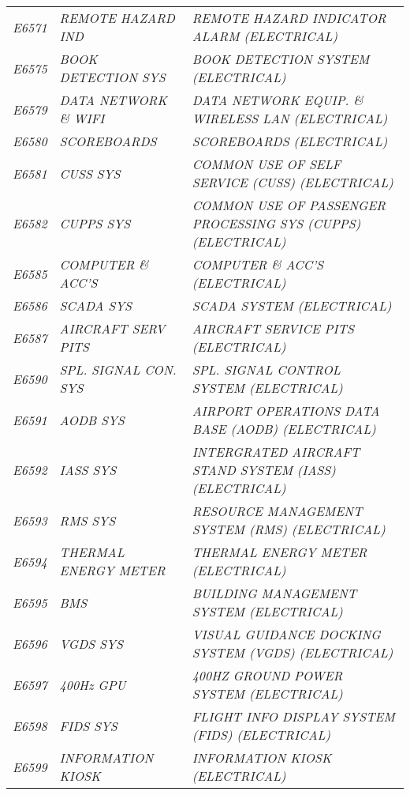\begin{landscape}
\begin{longtable}[l]{l%
                  l|%
                  l|}
\itshape E6571       &\itshape REMOTE HAZARD IND   &\itshape REMOTE HAZARD INDICATOR ALARM (ELECTRICAL)   \\
\itshape E6575       &\itshape BOOK DETECTION SYS   &\itshape BOOK DETECTION SYSTEM (ELECTRICAL)   \\
\itshape E6579       &\itshape DATA NETWORK \& WIFI   &\itshape DATA NETWORK EQUIP. \& WIRELESS LAN (ELECTRICAL)   \\
\itshape E6580       &\itshape SCOREBOARDS   &\itshape SCOREBOARDS (ELECTRICAL)   \\
\itshape E6581       &\itshape CUSS SYS   &\itshape COMMON USE OF SELF SERVICE (CUSS) (ELECTRICAL)   \\
\itshape E6582       &\itshape CUPPS SYS   &\itshape COMMON USE OF PASSENGER PROCESSING SYS (CUPPS) (ELECTRICAL)   \\
\itshape E6585       &\itshape COMPUTER \& ACC'S   &\itshape COMPUTER \& ACC'S (ELECTRICAL)   \\
\itshape E6586       &\itshape SCADA SYS   &\itshape SCADA SYSTEM (ELECTRICAL)   \\
\itshape E6587       &\itshape AIRCRAFT SERV PITS   &\itshape AIRCRAFT SERVICE PITS (ELECTRICAL)   \\
\itshape E6590       &\itshape SPL. SIGNAL CON. SYS   &\itshape SPL. SIGNAL CONTROL SYSTEM (ELECTRICAL)   \\
\itshape E6591       &\itshape AODB SYS   &\itshape AIRPORT OPERATIONS DATA BASE (AODB) (ELECTRICAL)   \\
\itshape E6592       &\itshape IASS SYS   &\itshape INTERGRATED AIRCRAFT STAND SYSTEM (IASS) (ELECTRICAL)   \\
\itshape E6593       &\itshape RMS SYS   &\itshape RESOURCE MANAGEMENT SYSTEM (RMS) (ELECTRICAL)   \\
\itshape E6594       &\itshape THERMAL ENERGY METER   &\itshape THERMAL ENERGY METER (ELECTRICAL)   \\
\itshape E6595       &\itshape BMS   &\itshape BUILDING MANAGEMENT SYSTEM (ELECTRICAL)   \\
\itshape E6596       &\itshape VGDS SYS   &\itshape VISUAL GUIDANCE DOCKING SYSTEM (VGDS) (ELECTRICAL)   \\
\itshape E6597       &\itshape 400Hz GPU   &\itshape 400HZ GROUND POWER SYSTEM (ELECTRICAL)   \\
\itshape E6598       &\itshape FIDS SYS   &\itshape FLIGHT INFO DISPLAY SYSTEM (FIDS) (ELECTRICAL)   \\
\itshape E6599       &\itshape INFORMATION KIOSK   &\itshape INFORMATION KIOSK (ELECTRICAL)   \\

\end{longtable}
\end{landscape}
